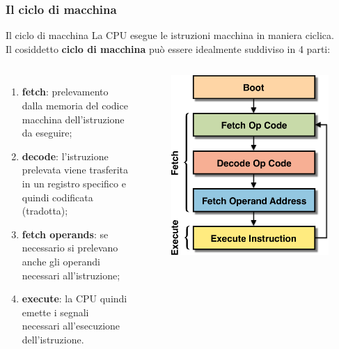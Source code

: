\begin{frame}
	\frametitle{Il ciclo di macchina}
	
	\begin{block}{Il ciclo di macchina}
		 La CPU esegue le istruzioni macchina in maniera ciclica.\\
		 Il cosiddetto \textbf{ciclo di macchina} può essere idealmente suddiviso in 4 parti:
		 
		\begin{columns}			
			\begin{enumerate}
			 	\item \textbf{fetch}: prelevamento dalla memoria del codice macchina dell’istruzione da eseguire;
			 	\item \textbf{decode}: l'istruzione prelevata viene trasferita in un registro specifico e quindi codificata (tradotta);
			 	\item \textbf{fetch operands}: se necessario si prelevano anche gli operandi necessari all'istruzione;
			 	\item \textbf{execute}: la CPU quindi emette i segnali necessari all'esecuzione dell’istruzione.
			 \end{enumerate}
			
			\begin{figure}[!htbp]
				\centering 
				\includegraphics[width=0.95\linewidth]{images/4_cpu/architecture_cpu_cycle.pdf}
			\end{figure} 
		\end{columns}
		 
		 
	\end{block}
	
\end{frame}


